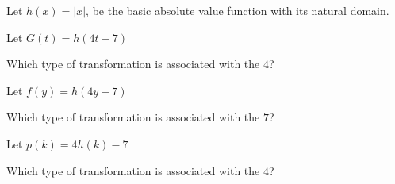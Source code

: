 \documentclass{ximera}
\author{Lee Wayand}
\begin{document}
\begin{exercise}




Let $h(x) = | x |$, be the basic absolute value function with its natural domain. \\


\begin{question}


Let $G(t) = h(4 t - 7)$


Which type of transformation is associated with the $4$?


\begin{multipleChoice}
\end{multipleChoice}


\end{question}








\begin{question}


Let $f(y) = h(4 y - 7)$


Which type of transformation is associated with the $7$?


\begin{multipleChoice}
\end{multipleChoice}


\end{question}






\begin{question}


Let $p(k) = 4 h(k) - 7$


Which type of transformation is associated with the $4$?


\begin{multipleChoice}
\end{multipleChoice}


\end{question}












\end{exercise}
\end{document}
